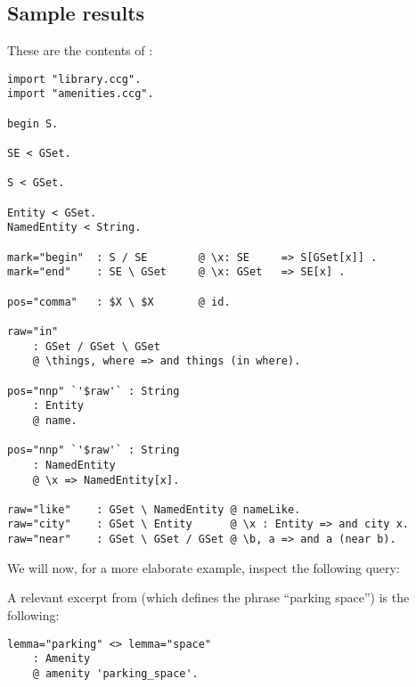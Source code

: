 \documentclass[main.tex]{subfiles}
\begin{document}
\subsection{Sample results}
These are the contents of :
\begin{lstwrap}\begin{lstlisting}
import "library.ccg".
import "amenities.ccg".

begin S.

SE < GSet.

S < GSet.

Entity < GSet.
NamedEntity < String.

mark="begin"  : S / SE        @ \x: SE     => S[GSet[x]] .
mark="end"    : SE \ GSet     @ \x: GSet   => SE[x] .

pos="comma"   : $X \ $X       @ id.

raw="in"
    : GSet / GSet \ GSet
    @ \things, where => and things (in where).

pos="nnp" `'$raw'` : String
    : Entity
    @ name.

pos="nnp" `'$raw'` : String
    : NamedEntity
    @ \x => NamedEntity[x].

raw="like"    : GSet \ NamedEntity @ nameLike.
raw="city"    : GSet \ Entity      @ \x : Entity => and city x.
raw="near"    : GSet \ GSet / GSet @ \b, a => and a (near b).
\end{lstlisting}\end{lstwrap}

We will now, for a more elaborate example, inspect the following query:
\begin{center}
\end{center}

A relevant excerpt from  (which defines the phrase
``parking space'') is the following:
\begin{lstwrap}\begin{lstlisting}
lemma="parking" <> lemma="space"
    : Amenity
    @ amenity 'parking_space'.
\end{lstlisting}\end{lstwrap}
\end{document}

